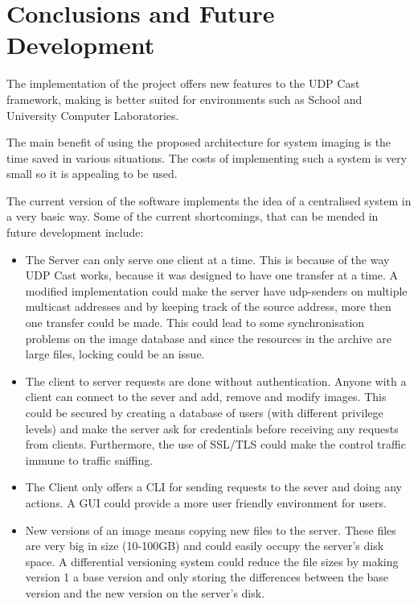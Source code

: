 

\chapter{Conclusions and Future Development}\label{ch:conclusions}


The implementation of the project offers new features to the UDP Cast
framework, making is better suited for environments such as School and
University Computer Laboratories.

The main benefit of using the proposed architecture for system imaging is
the time saved in various situations. The costs of implementing such a
system is very small so it is appealing to be used.

The current version of the software implements the idea of a centralised
system in a very basic way. Some of the current shortcomings, that can be
mended in future development include:

\begin{itemize}
\item The Server can only serve one client at a time. This is because of
the way UDP Cast works, because it was designed to have one transfer at a
time. A modified implementation could make the server have udp-senders on
multiple multicast addresses and by keeping track of the source address,
more then one transfer could be made. This could lead to some
synchronisation problems on the image database and since the resources in
the archive are large files, locking could be an issue.
\item The client to server requests are done without authentication. Anyone
with a client can connect to the sever and add, remove and modify images.
This could be secured by creating a database of users (with different
privilege levels) and make the server ask for credentials before receiving
any requests from clients. Furthermore, the use of SSL/TLS could make the
control traffic immune to traffic sniffing.
\item The Client only offers a \ac{CLI} for sending requests to the sever and
doing any actions. A \ac{GUI} could provide a more user friendly
environment for users.
\item New versions of an image means copying new files to the server. These
files are very big in size (10-100GB) and could easily occupy the server's
disk space. A differential versioning system could reduce the file sizes by
making version 1 a base version and only storing the differences between
the base version and the new version on the server's disk.
\end{itemize}



